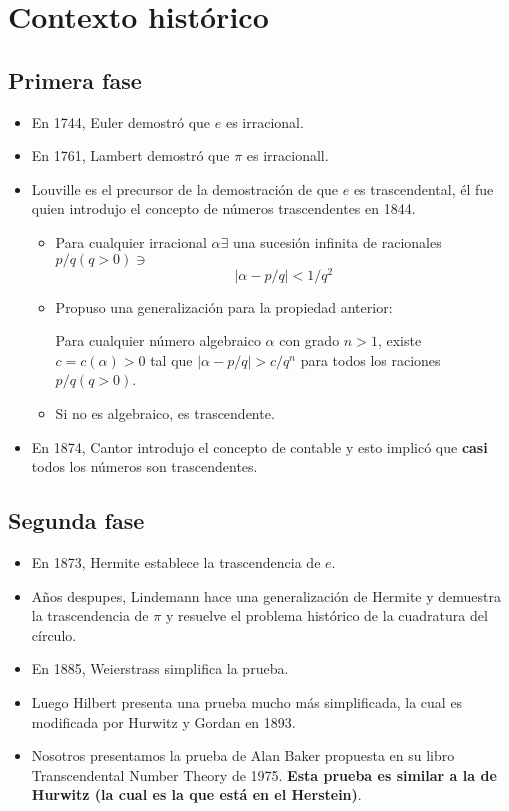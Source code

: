 





\section{Contexto histórico}

\subsection{Primera fase }
\begin{itemize}
    \item En 1744, Euler demostró que $e$ es irracional. 
    \item En 1761, Lambert demostró que $\pi$ es irracionall.
    \item Louville es el precursor de la demostración de que $e$ es trascendental, él fue quien introdujo el concepto de números trascendentes en 1844.
    \begin{itemize}
        \item Para cualquier irracional $\alpha\exists $ una sucesión infinita de racionales $p/q (q>0)\ni$
            $$|\alpha-p/q|<1/q^2$$
        \item Propuso una generalización para la propiedad anterior:
        \begin{nota}[Teorema]
            Para cualquier número algebraico $\alpha$ con grado $n>1$, existe $c=c(\alpha)>0$ tal que $|\alpha-p/q|>c/q^n$ para todos los raciones $p/q (q>0)$.
        \end{nota}
        \item Si no es algebraico, es trascendente.
    \end{itemize}
    \item En 1874, Cantor introdujo el concepto de contable y esto implicó que \textbf{casi} todos los números son trascendentes.
\end{itemize}

\subsection{Segunda fase }

\begin{itemize}
    \item En 1873, Hermite establece la trascendencia de $e$.
    \item Años despupes, Lindemann hace una generalización de Hermite y demuestra la trascendencia de $\pi$ y resuelve el problema histórico de la cuadratura del círculo. 
    \item En 1885, Weierstrass simplifica la prueba. 
    \item Luego Hilbert presenta una prueba mucho más simplificada, la cual es modificada por Hurwitz y Gordan en 1893. 
    \item Nosotros presentamos la prueba de Alan Baker propuesta en su libro Transcendental Number Theory de 1975. \textbf{Esta prueba es similar a la de Hurwitz (la cual es la que está en el Herstein)}.
\end{itemize}

